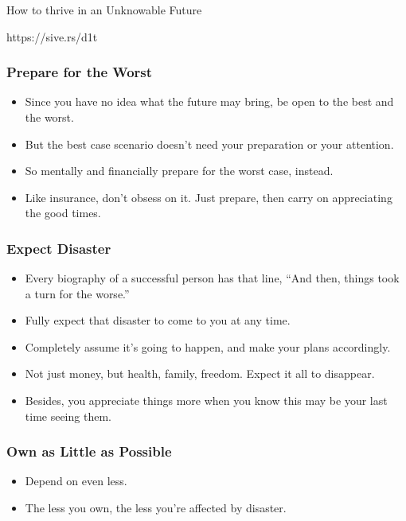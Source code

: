 \begin{frame}[fragile]\frametitle{}
\begin{center}
{\Large How to thrive in an Unknowable Future}
\end{center}

{\tiny https://sive.rs/d1t}

\end{frame}

\begin{frame}[fragile]\frametitle{Prepare for the Worst}

\begin{itemize}
\item Since you have no idea what the future may bring, be open to the best and the worst.
\item But the best case scenario doesn’t need your preparation or your attention.
\item So mentally and financially prepare for the worst case, instead.
\item Like insurance, don’t obsess on it. Just prepare, then carry on appreciating the good times.
\end{itemize}

\end{frame}


\begin{frame}[fragile]\frametitle{Expect Disaster}

\begin{itemize}
\item Every biography of a successful person has that line, “And then, things took a turn for the worse.”
\item Fully expect that disaster to come to you at any time.
\item Completely assume it’s going to happen, and make your plans accordingly.
\item Not just money, but health, family, freedom. Expect it all to disappear.
\item Besides, you appreciate things more when you know this may be your last time seeing them.
\end{itemize}

\end{frame}


\begin{frame}[fragile]\frametitle{Own as Little as Possible}

\begin{itemize}
\item Depend on even less.
\item The less you own, the less you’re affected by disaster.
\end{itemize}

\end{frame}

